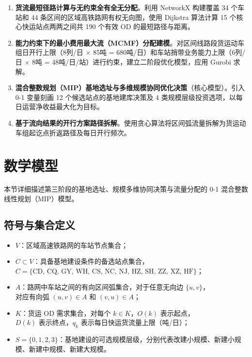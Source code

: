 \documentclass[12pt,a4paper,fontset=none]{ctexart}
\begin{document}
\begin{enumerate}[label=第\arabic*阶段：, leftmargin=*]
    \item \textbf{货流最短径路计算与无约束全有全无分配}。利用 NetworkX 构建覆盖 34 个车站和 44 条区间的区域高铁路网有权无向图，使用 Dijkstra 算法计算 15 个核心快运站点两两之间共 190 个有效 OD 的最短路径与距离。
    
    \item \textbf{能力约束下的最小费用最大流（MCMF）分配建模}。对区间线路段货运动车组日开行上限（8列/日 $\times$ 85吨 = 680吨/日）和车站捎带业务能力上限（6列/日 $\times$ 8吨 = 48吨/日/站）进行约束，建立二阶段优化模型，应用 Gurobi 求解。
    
    \item \textbf{混合整数规划（MIP）基地选址与多维规模协同优化决策}（核心模型）。引入 0-1 变量刻画 12 个候选站点的基地建库决策及 4 类规模层级投资选项，以每日运营净收益最大化为目标。
    
    \item \textbf{基于流向结果的开行方案路径拆解}。使用贪心算法将区间弧流量拆解为货运动车组起讫点折返路径及每日开行频次。
\end{enumerate}

\section{数学模型}

本节详细描述第三阶段的基地选址、规模多维协同决策与流量分配的 0-1 混合整数线性规划（MIP）模型。

\subsection{符号与集合定义}

\begin{itemize}[leftmargin=*]
    \item $V$：区域高速铁路网的车站节点集合；
    \item $C \subset V$：具备基地建设条件的备选站点集合，\\[2pt]
          $C = \{\text{CD, CQ, GY, WH, CS, NC, NJ, HZ, SH, ZZ, XZ, HF}\}$；
    \item $A$：路网中车站之间的有向区间弧集合，对于任意无向边 $\{u,v\}$，\\[2pt]
          对应有向弧 $(u,v) \in A$ 和 $(v,u) \in A$；
    \item $K$：货运 OD 需求集合，对每个 $k \in K$，$O(k)$ 表示起点，\\[2pt]
          $D(k)$ 表示终点，$q_k$ 表示每日快运货流量上限（吨/日）；
    \item $S = \{0, 1, 2, 3\}$：基地建设的可选规模层级，分别代表改建小规模、新建小规模、新建中规模、新建大规模。
\end{itemize}
\end{document}
